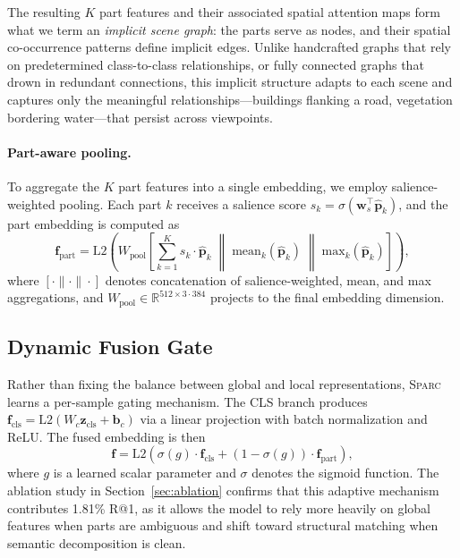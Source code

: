 \documentclass[sigconf, anonymous, review]{acmart}
\newcommand{\ours}{\textsc{Sparc}}
\newcommand{\reals}{\mathbb{R}}
\begin{document}
The resulting $K$ part features and their associated spatial attention maps form what we term an \emph{implicit scene graph}: the parts serve as nodes, and their spatial co-occurrence patterns define implicit edges.
Unlike handcrafted graphs that rely on predetermined class-to-class relationships, or fully connected graphs that drown in redundant connections, this implicit structure adapts to each scene and captures only the meaningful relationships---buildings flanking a road, vegetation bordering water---that persist across viewpoints.

\paragraph{Part-aware pooling.}
To aggregate the $K$ part features into a single embedding, we employ salience-weighted pooling.
Each part $k$ receives a salience score $s_k = \sigma(\mathbf{w}_s^\top \hat{\mathbf{p}}_k)$, and the part embedding is computed as
\begin{equation}
\mathbf{f}_\text{part} = \text{L2}\!\left(W_\text{pool}\left[\sum_{k=1}^K s_k \cdot \hat{\mathbf{p}}_k \;\middle\|\; \text{mean}_k(\hat{\mathbf{p}}_k) \;\middle\|\; \text{max}_k(\hat{\mathbf{p}}_k)\right]\right),
\label{eq:partpool}
\end{equation}
where $[\cdot\|\cdot\|\cdot]$ denotes concatenation of salience-weighted, mean, and max aggregations, and $W_\text{pool} \in \reals^{512 \times 3 \cdot 384}$ projects to the final embedding dimension.

\subsection{Dynamic Fusion Gate}
\label{sec:fusion}

Rather than fixing the balance between global and local representations, \ours{} learns a per-sample gating mechanism.
The CLS branch produces $\mathbf{f}_\text{cls} = \text{L2}(W_c \mathbf{z}_\text{cls} + \mathbf{b}_c)$ via a linear projection with batch normalization and ReLU.
The fused embedding is then
\begin{equation}
\mathbf{f} = \text{L2}\!\left(\sigma(g) \cdot \mathbf{f}_\text{cls} + (1 - \sigma(g)) \cdot \mathbf{f}_\text{part}\right),
\label{eq:fusion}
\end{equation}
where $g$ is a learned scalar parameter and $\sigma$ denotes the sigmoid function.
The ablation study in Section~\ref{sec:ablation} confirms that this adaptive mechanism contributes 1.81\% R@1, as it allows the model to rely more heavily on global features when parts are ambiguous and shift toward structural matching when semantic decomposition is clean.
\end{document}
